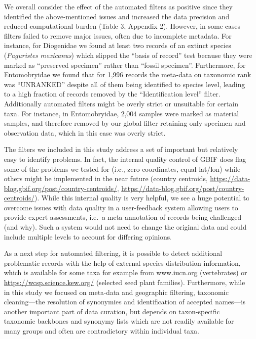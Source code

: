 \documentclass[fleqn,10pt,lineno]{wlpeerj} %
\begin{document}
We overall consider the effect of the automated filters as positive since they identified the above-mentioned issues and increased the data precision and reduced computational burden (Table 3, Appendix 2). However, in some cases filters failed to remove major issues, often due to incomplete metadata. For instance, for Diogenidae we found at least two records of an extinct species (\emph{Paguristes mexicanus}) which slipped the ``basis of record'' test because they were marked as ``preserved specimen'' rather than ``fossil specimen''. Furthermore, for Entomobryidae we found that for 1,996 records the meta-data on taxonomic rank was ``UNRANKED'' despite all of them being identified to species level, leading to a high fraction of records removed by the ``Identification level'' filter. Additionally automated filters might be overly strict or unsuitable for certain taxa. For instance, in Entomobryidae, 2,004 samples were marked as material samples, and therefore removed by our global filter retaining only specimen and observation data, which in this case was overly strict.

The filters we included in this study address a set of important but relatively easy to identify problems. In fact, the internal quality control of GBIF does flag some of the problems we tested for (i.e., zero coordinates, equal lat/lon) while others might be implemented in the near future (country centroids, \url{https://data-blog.gbif.org/post/country-centroids/}, \url{https://data-blog.gbif.org/post/country-centroids/}). While this internal quality is very helpful, we see a huge potential to overcome issues with data quality in a user-feedback system allowing users to provide expert assessments, i.e.~a meta-annotation of records being challenged (and why). Such a system would not need to change the original data and could include multiple levels to account for differing opinions.

As a next step for automated filtering, it is possible to detect additional problematic records with the help of external species distribution information, which is available for some taxa for example from www.iucn.org (vertebrates) or \url{https://wcsp.science.kew.org/} (selected seed plant families). Furthermore, while in this study we focused on meta-data and geographic filtering, taxonomic cleaning---the resolution of synonymies and identification of accepted names---is another important part of data curation, but depends on taxon-specific taxonomic backbones and synonymy lists which are not readily available for many groups and often are contradictory within individual taxa.
\end{document}
